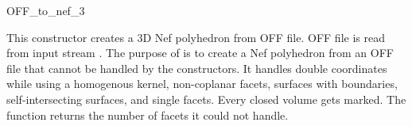 
\ccHtmlNoClassLinks
\begin{ccRefFunction}{OFF_to_nef_3}
\label{refOFF_to_nef_3}

\ccDefinition

This constructor creates a 3D Nef polyhedron from OFF file. OFF file
is read from input stream . The purpose of 
is to create a Nef polyhedron from an OFF file that cannot be handled
by the  constructors. It handles double
coordinates while using a homogenous kernel, non-coplanar facets,
surfaces with boundaries, self-intersecting surfaces, and single
facets. Every closed volume gets marked. The function returns the
number of facets it could not handle.


\ccSeeAlso
{}\\ 

\end{ccRefFunction}
